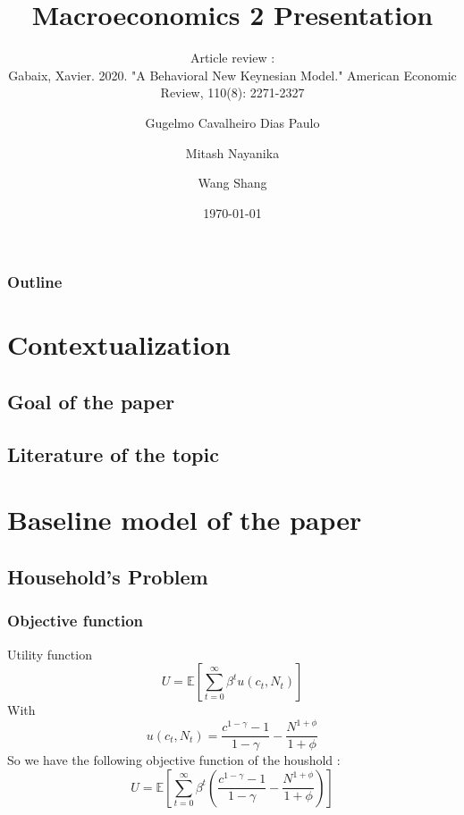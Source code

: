 \documentclass{beamer}
\title{Macroeconomics 2 Presentation}
\subtitle{Article review :\\ Gabaix, Xavier. 2020. "A Behavioral New Keynesian Model." American Economic Review, 110(8): 2271-2327}
\author{Gugelmo Cavalheiro Dias Paulo \\ \and Mitash Nayanika \\ \and Wang Shang}
\institute{Sciences Po}
\date{\today}
\begin{document}
\begin{frame}
    \titlepage
\end{frame}

\begin{frame}
    \frametitle{Outline}
    \tableofcontents[hideallsubsections]
\end{frame}

\section{Contextualization}
\begin{frame}
\end{frame}

\subsection{Goal of the paper}
\subsection{Literature of the topic}

\section{Baseline model of the paper}
\begin{frame}
\end{frame}

\subsection{Household's Problem}

\subsubsection{Objective function}
\begin{frame}{Utility function}
    \begin{equation}
        \label{3}
        U = \mathbb{E}\left[\sum_{t=0}^{\infty}\beta^{t}u(c_t,N_t)\right]
    \end{equation}
    With
    \begin{equation*}
    u(c_t,N_t) = \frac{c^{1-\gamma}-1}{1-\gamma}-\frac{N^{1+\phi}}{1+\phi}
    \end{equation*}
    So we have the following objective function of the houshold : 
    \begin{equation*}
        U = \mathbb{E}\left[\sum_{t=0}^{\infty}\beta^{t}\left(\frac{c^{1-\gamma}-1}{1-\gamma}-\frac{N^{1+\phi}}{1+\phi}\right)\right]
    \end{equation*}
\end{frame}
\end{document}
